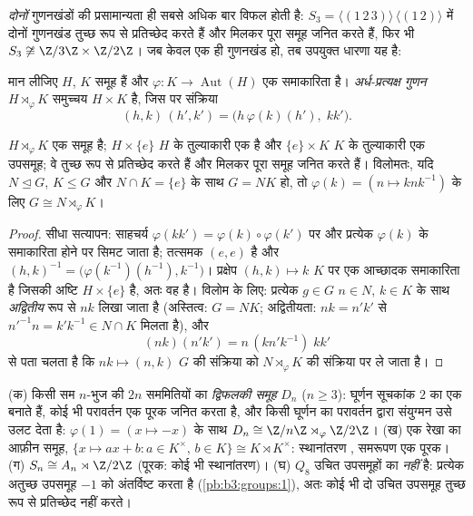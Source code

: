 \emph{दोनों} गुणनखंडों की प्रसामान्यता ही सबसे अधिक बार विफल
होती है: $S_3
= \langle (1\,2\,3)\rangle \,\langle(1\,2)\rangle$ में दोनों गुणनखंड तुच्छ रूप से प्रतिच्छेद करते हैं
और मिलकर पूरा समूह जनित करते हैं, फिर भी $S_3 \not\cong \Z/3\Z \times
\Z/2\Z$। जब केवल एक ही
गुणनखंड  हो, तब उपयुक्त धारणा यह है:

\begin{definition}\label{def:b3:groups:semidirect}
मान लीजिए $H$, $K$ समूह हैं और $\varphi \colon K \to
\operatorname{Aut}(H)$ एक समाकारिता है।
\emph{अर्ध-प्रत्यक्ष गुणन} $H \rtimes_\varphi K$
समुच्चय $H \times K$ है, जिस पर संक्रिया
\[
(h, k)\,(h', k') = \bigl(h\,\varphi(k)(h'),\; kk'\bigr).
\]
\end{definition}

\begin{proposition}\label{prop:b3:groups:semidirect}
$H \rtimes_\varphi K$ एक समूह है; $H \times \{e\}$ $H$ के तुल्याकारी एक 
है और $\{e\} \times K$ $K$ के तुल्याकारी एक उपसमूह; वे तुच्छ रूप से
प्रतिच्छेद करते हैं और मिलकर पूरा समूह जनित करते हैं। विलोमतः,
यदि $N \trianglelefteq G$, $K \leq G$ और $N \cap K = \{e\}$ के साथ $G =
NK$ हो, तो $\varphi(k) = (n \mapsto
knk^{-1})$ के लिए
$G \cong N \rtimes_\varphi K$।
\end{proposition}

\begin{proof}
सीधा सत्यापन: साहचर्य $\varphi(kk') =
\varphi(k)\circ\varphi(k')$ पर और प्रत्येक $\varphi(k)$ के समाकारिता
होने पर सिमट जाता है; तत्समक $(e,e)$ है और $(h,k)^{-1} =
\bigl(\varphi(k^{-1})(h^{-1}), k^{-1}\bigr)$। प्रक्षेप $(h,k)
\mapsto k$
$K$ पर एक आच्छादक समाकारिता है जिसकी अष्टि $H \times \{e\}$ है, अतः वह
 है। विलोम के लिए: प्रत्येक $g \in G$ $n \in N$, $k \in K$ के साथ
\emph{अद्वितीय} रूप से $nk$ लिखा जाता है (अस्तित्व: $G =
NK$;
अद्वितीयता: $nk = n'k'$ से $n'^{-1}n = k'k^{-1} \in N \cap
K$ मिलता है), और
\[
(nk)(n'k') = n\,(kn'k^{-1})\;kk'
\]
से पता चलता है कि $nk \mapsto (n, k)$ $G$ की संक्रिया को $N \rtimes_\varphi K$ की संक्रिया
पर ले जाता है।
\end{proof}

\begin{example}\label{ex:b3:groups:semidirectexamples}
(क) किसी सम $n$-भुज की $2n$ सममितियों का \emph{द्विफलकी
समूह} $D_n$ ($n \geq
3$): घूर्णन सूचकांक $2$
का एक  बनाते हैं, कोई भी परावर्तन एक पूरक जनित
करता है, और किसी घूर्णन का परावर्तन द्वारा संयुग्मन उसे उलट देता
है: $\varphi(1) = (x
\mapsto -x)$ के साथ $D_n \cong \Z/n\Z \rtimes_\varphi \Z/2\Z$।
(ख) एक रेखा का आफ़ीन समूह, $\{x \mapsto ax + b : a \in
K^\times,\, b \in K\} \cong K \rtimes K^\times$: स्थानांतरण ,
समरूपण एक पूरक।
(ग) $S_n \cong A_n \rtimes \Z/2\Z$ (पूरक: कोई भी स्थानांतरण)।
(घ)  $Q_8$ उचित उपसमूहों का 
\emph{नहीं} है: प्रत्येक अतुच्छ उपसमूह $-1$ को अंतर्विष्ट करता
है (\cref{pb:b3:groups:1}), अतः कोई भी दो उचित उपसमूह तुच्छ रूप से प्रतिच्छेद
नहीं करते।
\end{example}

